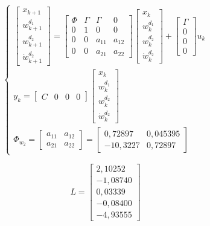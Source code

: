 \documentclass[12pt,a4paper,final,twoside,openright]{report}
\begin{document}
\begin{equation}\label{eq:pert_sin_ct_model_mat}
\left\{
\begin{array}{lr}
\begin{bmatrix}
x_{k+1}\\
w_{k+1}^{d_1}\\
w_{k+1}^{d_2}\\
\dot{w}_{k+1}^{d_2}
\end{bmatrix} = 
\begin{bmatrix}
\Phi & \Gamma & \Gamma & 0\\
0 & 1 & 0 & 0\\
0 & 0 & a_{11} & a_{12}\\
0 & 0 & a_{21} & a_{22}
\end{bmatrix} \begin{bmatrix}
x_{k}\\
w_k^{d_1}\\
w_k^{d_2}\\
\dot{w}_k^{d_2}
\end{bmatrix} + 
\begin{bmatrix}
\Gamma\\
0\\
0\\
0
\end{bmatrix} u_k\\

y_k=\begin{bmatrix}
C & 0 & 0 & 0
\end{bmatrix} \begin{bmatrix}
x_{k}\\
w_k^{d_1}\\
w_k^{d_2}\\
\dot{w}_k^{d_2}
\end{bmatrix}\\

\Phi_{w_2}=\begin{bmatrix}
a_{11} & a_{12}\\
a_{21} & a_{22}
\end{bmatrix} = \begin{bmatrix}
0,72897 & 0,045395\\
-10,3227 & 0,72897
\end{bmatrix}

\end{array}
\right.
\end{equation}

\begin{equation}\label{eq:pert_sin_ct_L}
L=\begin{bmatrix}
2,10252\\
-1,08740\\
0,03339\\
-0,08400\\
-4,93555
\end{bmatrix}
\end{equation}
\end{document}
